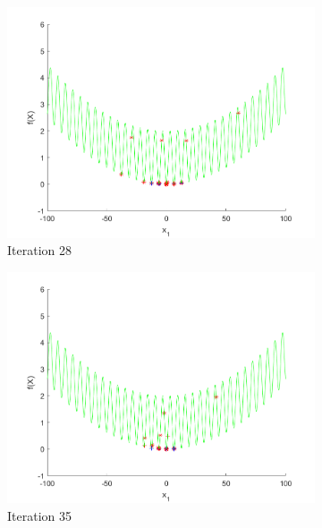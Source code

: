 \begin{figure}
\begin{subfigure}[b]{0.4\textwidth}
   \includegraphics[width=\textwidth]{img/smpl/grwnk1d/loa-iter-28}
   \caption{Iteration 28}
   \label{fig:s6-iter-4}
 \end{subfigure}
 \begin{subfigure}[b]{0.4\textwidth}
   \includegraphics[width=\textwidth]{img/smpl/grwnk1d/loa-iter-35}
   \caption{Iteration 35}
   \label{fig:s6-iter-5}
 \end{subfigure}
 \begin{subfigure}[b]{0.4\textwidth}

\end{subfigure}
\end{figure}
